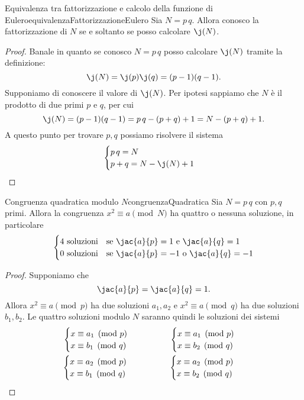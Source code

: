 	\begin{prop}{Equivalenza tra fattorizzazione e calcolo della funzione di Eulero}{equivalenzaFattorizzazioneEulero}
	Sia \(N=p\,q\). Allora conosco la fattorizzazione di \(N\) se e soltanto se posso calcolare \(\j(N)\).
	\end{prop}

	\begin{proof}
	\graffito{\(\Rightarrow)\)} Banale in quanto se conosco \(N=p\,q\) posso calcolare \(\j(N)\) tramite la definizione:
		\[
		\j(N) = \j(p)\j(q) = (p-1)(q-1).
		\]
	\graffito{\(\Leftarrow)\)}Supponiamo di conoscere il valore di \(\j(N)\). Per ipotesi sappiamo che \(N\) è il prodotto di due primi \(p\) e \(q\), per cui
		\[
		\j(N) = (p-1)(q-1) = p\,q - (p+q) +1 = N-(p+q)+1.
		\]
	A questo punto per trovare \(p,q\) possiamo risolvere il sistema
		\[
		\begin{cases}
		p\,q = N\\
		p+q = N-\j(N)+1
		\end{cases}
		\]
	\end{proof}

	\begin{prop}{Congruenza quadratica modulo \(N\)}{congruenzaQuadratica}
	Sia \(N=p\,q\) con \(p,q\) primi. Allora la congruenza \(x^2 \equiv a \pmod{N}\) ha quattro o nessuna soluzione, in particolare
		\[
		\begin{cases}
		4\text{ soluzioni} & \text{se }\jac{a}{p}=1\text{ e }\jac{a}{q}=1\\
		0\text{ soluzioni} & \text{se }\jac{a}{p}=-1\text{ o }\jac{a}{q}=-1\\
		\end{cases}
		\]
	\end{prop}

	\begin{proof}
	Supponiamo che
		\[
		\jac{a}{p}=\jac{a}{q}=1.
		\]
	Allora \(x^2 \equiv a \pmod{p}\) ha due soluzioni \(a_1,a_2\) e \(x^2 \equiv a \pmod{q}\) ha due soluzioni \(b_1,b_2\).
	Le quattro soluzioni modulo \(N\) saranno quindi le soluzioni dei sistemi
		\begin{gather*}
		\begin{cases}
		x \equiv a_1 \pmod{p}\\
		x \equiv b_1 \pmod{q}
		\end{cases}\qquad \qquad
		\begin{cases}
		x \equiv a_1 \pmod{p}\\
		x \equiv b_2 \pmod{q}
		\end{cases}\\
		\begin{cases}
		x \equiv a_2 \pmod{p}\\
		x \equiv b_1 \pmod{q}
		\end{cases}\qquad \qquad
		\begin{cases}
		x \equiv a_2 \pmod{p}\\
		x \equiv b_2 \pmod{q}
		\end{cases}\qedhere
		\end{gather*}
	\end{proof}

